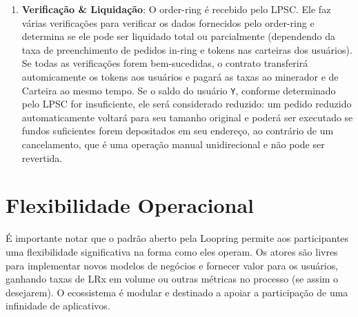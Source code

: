 \documentclass[UTF8,nofonts]{article}
\makeatletter
\newenvironment{figurehere}
 {\def\@captype{figure}}
 {}
\makeatother
\begin{document}
\begin{multicols}{2}
\begin{enumerate}
\item \textbf{Verificação \& Liquidação}: O order-ring é recebido pelo LPSC. Ele faz várias verificações para verificar os dados fornecidos pelo order-ring e determina se ele pode ser liquidado total ou parcialmente (dependendo da taxa de preenchimento de pedidos in-ring e tokens nas carteiras dos usuários). Se todas as verificações forem bem-sucedidas, o contrato transferirá automicamente os tokens aos usuários e pagará as taxas ao minerador e de Carteira ao mesmo tempo. Se o saldo do usuário \verb|Y|, conforme determinado pelo LPSC for insuficiente, ele será considerado reduzido: um pedido reduzido automaticamente voltará para seu tamanho original e poderá ser executado se fundos suficientes forem depositados em seu endereço, ao contrário de um cancelamento, que é uma operação manual unidirecional e não pode ser revertida.


\end{enumerate}





%
%
%

\section{Flexibilidade Operacional\label{sec:business_model}}
É importante notar que o padrão aberto pela Loopring permite aos participantes uma flexibilidade significativa na forma como eles operam. Os atores são livres para implementar novos modelos de negócios e fornecer valor para os usuários, ganhando taxas de LRx em volume ou outras métricas no processo (se assim o desejarem). O ecossistema é modular e destinado a apoiar a participação de uma infinidade de aplicativos.



\end{multicols}
\end{document}
